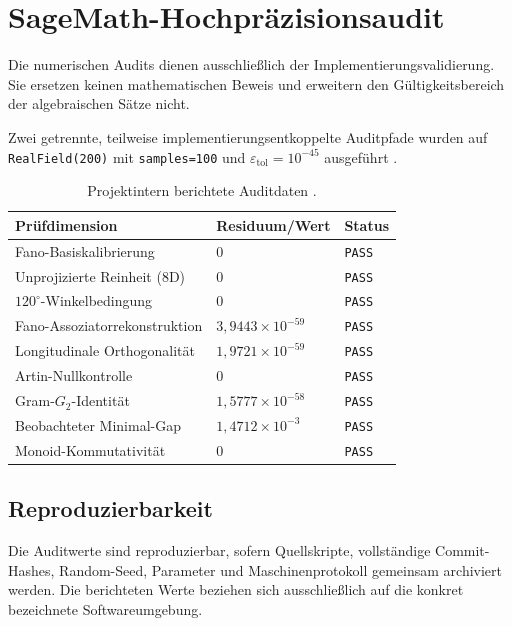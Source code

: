\documentclass[11pt,a4paper]{article}
\begin{document}
\section{SageMath-Hochpräzisionsaudit}
Die numerischen Audits dienen ausschließlich der Implementierungsvalidierung. Sie ersetzen keinen mathematischen Beweis und erweitern den Gültigkeitsbereich der algebraischen Sätze nicht.

Zwei getrennte, teilweise implementierungsentkoppelte Auditpfade wurden auf \texttt{RealField(200)} mit \texttt{samples=100} und $\varepsilon_{\mathrm{tol}}=10^{-45}$ ausgeführt \cite{eabcAudit}.

\begin{table}[h!]
\centering
\caption{Projektintern berichtete Auditdaten \cite{eabcAudit}.}
\begin{tabularx}{\textwidth}{@{}Xll@{}}
\toprule
\textbf{Prüfdimension} & \textbf{Residuum/Wert} & \textbf{Status} \\
\midrule
Fano-Basiskalibrierung & $0$ & \texttt{PASS} \\
Unprojizierte Reinheit (8D) & $0$ & \texttt{PASS} \\
$120^\circ$-Winkelbedingung & $0$ & \texttt{PASS} \\
Fano-Assoziatorrekonstruktion & $3{,}9443\times10^{-59}$ & \texttt{PASS} \\
Longitudinale Orthogonalität & $1{,}9721\times10^{-59}$ & \texttt{PASS} \\
Artin-Nullkontrolle & $0$ & \texttt{PASS} \\
Gram-$G_2$-Identität & $1{,}5777\times10^{-58}$ & \texttt{PASS} \\
Beobachteter Minimal-Gap & $1{,}4712\times10^{-3}$ & \texttt{PASS} \\
Monoid-Kommutativität & $0$ & \texttt{PASS} \\
\bottomrule
\end{tabularx}
\end{table}

\subsection*{Reproduzierbarkeit}
Die Auditwerte sind reproduzierbar, sofern Quellskripte, vollständige Commit-Hashes, Random-Seed, Parameter und Maschinenprotokoll gemeinsam archiviert werden. Die berichteten Werte beziehen sich ausschließlich auf die konkret bezeichnete Softwareumgebung.
\end{document}
